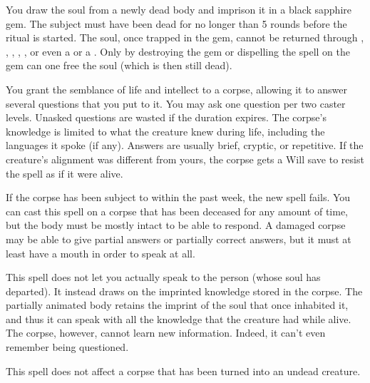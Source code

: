 \spellrng{\rngclose}
\begin{spelleffect}
You draw the soul from a newly dead body and imprison it in a black sapphire gem. The subject must have been dead for no longer than 5 rounds before the ritual is started. The soul, once trapped in the gem, cannot be returned through , , , , , or even a  or a . Only by destroying the gem or dispelling the spell on the gem can one free the soul (which is then still dead).
\end{spelleffect}

\spellrng{\rngclose}
\begin{spelleffect}
You grant the semblance of life and intellect to a corpse, allowing it to answer several questions that you put to it. You may ask one question per two caster levels. Unasked questions are wasted if the duration expires. The corpse's knowledge is limited to what the creature knew during life, including the languages it spoke (if any). Answers are usually brief, cryptic, or repetitive. If the creature's alignment was different from yours, the corpse gets a Will save to resist the spell as if it were alive.
\par If the corpse has been subject to  within the past week, the new spell fails. You can cast this spell on a corpse that has been deceased for any amount of time, but the body must be mostly intact to be able to respond. A damaged corpse may be able to give partial answers or partially correct answers, but it must at least have a mouth in order to speak at all.
\par This spell does not let you actually speak to the person (whose soul has departed). It instead draws on the imprinted knowledge stored in the corpse. The partially animated body retains the imprint of the soul that once inhabited it, and thus it can speak with all the knowledge that the creature had while alive. The corpse, however, cannot learn new information. Indeed, it can't even remember being questioned.
\end{spelleffect}
\begin{spellnotes}
This spell does not affect a corpse that has been turned into an undead creature.
\end{spellnotes}

